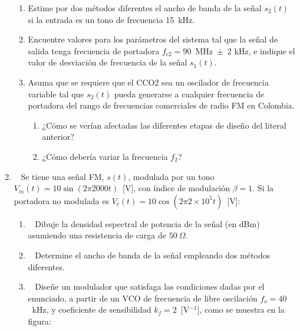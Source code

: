 \begin{enumerate}
\begin{enumerate}
	\item Estime por dos métodos diferentes el ancho de banda de la señal $s_2(t)$ si la entrada es un tono de frecuencia 15~kHz.
	
	\item Encuentre valores para los parámetros del sistema tal que la señal de salida tenga frecuencia de portadora $f_{c2} = 90$~MHz~$\pm$~2 kHz, e indique el valor de desviación de frecuencia de la señal $s_1(t)$.
	
	\item Asuma que se requiere que el CCO2 sea un oscilador de frecuencia variable tal que $s_2(t)$ pueda generarse a cualquier frecuencia de portadora del rango de frecuencias comerciales de radio FM en Colombia. 
	\begin{enumerate}
		\item ¿Cómo se verían afectadas las diferentes etapas de diseño del literal anterior?
		
		
		\item ¿Cómo debería variar la frecuencia $f_2$?
	\end{enumerate}
\end{enumerate}
\item~ Se tiene una señal FM, $s(t)$, modulada por un tono $V_m(t)=10\sin(2\pi 2000t)$~[V], con índice de modulación $\beta=1$. Si la portadora no modulada es $V_c (t)=10\cos(2\pi 2\times 10^5 t)$~[V]:
\begin{enumerate}
	\item~ Dibuje la densidad espectral de potencia de la señal (en dBm) asumiendo una resistencia de carga de $50~\Omega$.
	\item~ Determine el ancho de banda de la señal empleando dos métodos diferentes.
	
	\item~ Diseñe un modulador que satisfaga las condiciones dadas por el enunciado, a partir de un VCO de frecuencia de libre oscilación $f_o=40$~kHz, y coeficiente de sensibilidad $k_f=2$~[V$^{-1}$], como se muestra en la figura:

\vspace{200px}


\end{enumerate}
\end{enumerate}
